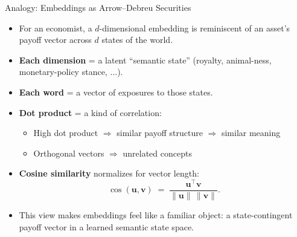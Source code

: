 \documentclass[10pt,english,aspectratio=169]{beamer}
\begin{document}
\begin{frame}{Analogy: Embeddings as Arrow--Debreu Securities}
\begin{itemize}
\item For an economist, a $d$-dimensional embedding is reminiscent of an asset's payoff vector across $d$ states of the world.

\medskip
\item \textbf{Each dimension} = a latent ``semantic state'' (royalty, animal-ness, monetary-policy stance, $\ldots$).

\medskip
\item \textbf{Each word} = a vector of exposures to those states.

\medskip
\item \textbf{Dot product} = a kind of correlation:
\begin{itemize}
    \item High dot product $\Rightarrow$ similar payoff structure $\Rightarrow$ similar meaning
    \item Orthogonal vectors $\Rightarrow$ unrelated concepts
\end{itemize}

\medskip
\item \textbf{Cosine similarity} normalizes for vector length:
\[
   \cos(\mathbf{u}, \mathbf{v}) \;=\; \frac{\mathbf{u}^{\top}\mathbf{v}}{\|\mathbf{u}\|\,\|\mathbf{v}\|}.
\]

\medskip
\item This view makes embeddings feel like a familiar object: a state-contingent payoff vector in a learned semantic state space.
\end{itemize}
\end{frame}
\end{document}
